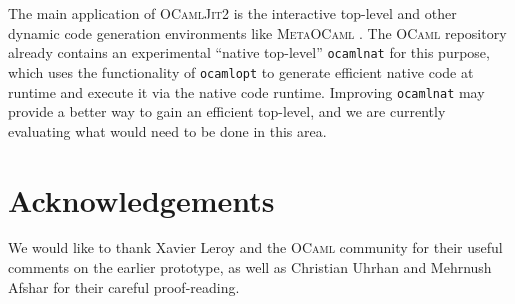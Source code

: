 \documentclass[12pt,a4paper,final]{article}
\begin{document}
The main application of \textsc{OCamlJit2} is the interactive top-level and other
dynamic code generation environments like \textsc{MetaOCaml} \cite{Taha06}. The
\textsc{OCaml} repository already contains an experimental ``native top-level''
\texttt{ocamlnat} for this purpose, which uses the functionality of \texttt{ocamlopt}
to generate efficient native code at runtime and execute it via the native code
runtime. Improving \texttt{ocamlnat} may provide a better way to gain an efficient
top-level, and we are currently evaluating what would need to be done in this
area.


\section*{Acknowledgements}

We would like to thank Xavier Leroy and the \textsc{OCaml} community for their
useful comments on the earlier prototype, as well as Christian Uhrhan and
Mehrnush Afshar for their careful proof-reading.




\end{document}

